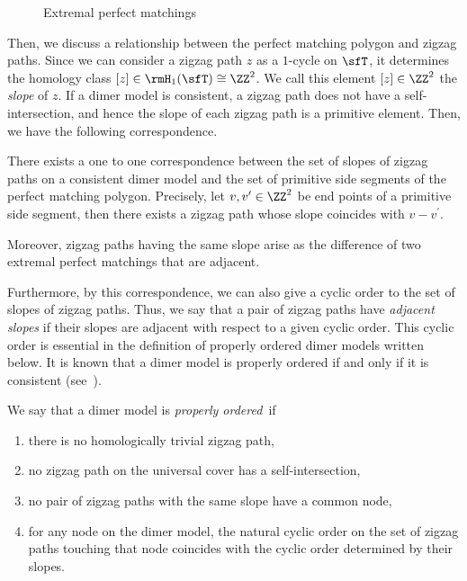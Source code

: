\begin{figure}[H]
{{\begin{tikzpicture}
\end{tikzpicture}
}}
\caption{Extremal perfect matchings}
\label{pm_4a}
\end{figure}

Then, we discuss a relationship between the perfect matching polygon and zigzag paths. Since we can consider a zigzag path $z$ as a $1$-cycle on $\sfT$, it determines the homology class $[z]\in\rmH_1(\sfT)\cong\ZZ^2$. We call this element $[z]\in\ZZ^2$ the \emph{slope} of $z$. If a dimer model is consistent, a zigzag path does not have a self-intersection, and hence the slope of each zigzag path is a primitive element. Then, we have the following correspondence.

\begin{prop}\label{zigzag_sidepolygon}
There exists a one to one correspondence between the set of slopes of zigzag paths on a consistent dimer model and the set of primitive side segments of the perfect matching polygon. Precisely, let $v,v^\prime\in\ZZ^2$ be end points of a primitive side segment, then there exists a zigzag path whose slope coincides with $v-v^\prime$.

Moreover, zigzag paths having the same slope arise as the difference of two extremal perfect matchings that are adjacent.
\end{prop}

Furthermore, by this correspondence, we can also give a cyclic order to the set of slopes of zigzag paths. Thus, we say that a pair of zigzag paths have \emph{adjacent slopes} if their slopes are adjacent with respect to a given cyclic order. This cyclic order is essential in the definition of properly ordered dimer models written below. It is known that a dimer model is properly ordered if and only if it is consistent (see~\cite[Proposition~4.4]{IU1}).

\begin{defi}\label{def_properly}
We say that a dimer model is \emph{properly ordered}~if
\begin{enumerate}%
\item there is no homologically trivial zigzag path,
\item no zigzag path on the universal cover has a self-intersection,
\item no pair of zigzag paths with the same slope have a common node,
\item for any node on the dimer model, the natural cyclic order on the set of zigzag paths touching that node coincides with the cyclic order determined by their slopes.
\end{enumerate}
\end{defi}

